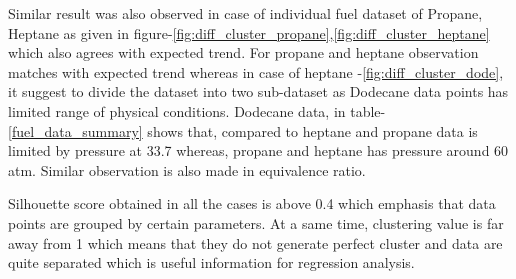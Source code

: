 \documentclass[preprint,12pt]{elsarticle}
\begin{document}
						Similar result was also observed in case of individual fuel dataset of Propane, Heptane as given in figure-\ref{fig:diff_cluster_propane},\ref{fig:diff_cluster_heptane} which also agrees with expected trend. For propane and heptane observation  matches with expected trend whereas in case of heptane -\ref{fig:diff_cluster_dode}, it suggest to divide the dataset into two sub-dataset as Dodecane data points has limited range of physical conditions. Dodecane data, in table-\ref{fuel_data_summary} shows that, compared to heptane and propane data is limited by pressure at 33.7 whereas, propane and heptane has pressure around 60 atm. Similar observation is also made in equivalence ratio.						  
						
						Silhouette score obtained in all the cases is above 0.4 which emphasis that data points are grouped by certain parameters. At a same time, clustering value is far away from 1 which means that they do not generate perfect cluster and data are quite separated  which is useful information for regression analysis. 
\end{document}
